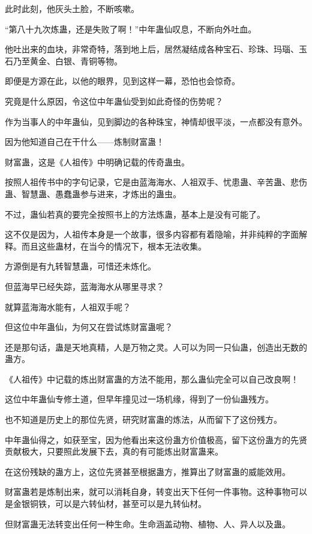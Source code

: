 \begin{this_body}
此时此刻，他灰头土脸，不断咳嗽。

“第八十九次炼蛊，还是失败了啊！”中年蛊仙叹息，不断向外吐血。

他吐出来的血块，非常奇特，落到地上后，居然凝结成各种宝石、珍珠、玛瑙、玉石乃至黄金、白银、青铜等物。

即便是方源在此，以他的眼界，见到这样一幕，恐怕也会惊奇。

究竟是什么原因，令这位中年蛊仙受到如此奇怪的伤势呢？

作为当事人的中年蛊仙，见到脚边的各种珠宝，神情却很平淡，一点都没有意外。

因为他知道自己在干什么——炼制财富蛊！

财富蛊，这是《人祖传》中明确记载的传奇蛊虫。

按照人祖传书中的字句记录，它是由蓝海海水、人祖双手、忧患蛊、辛苦蛊、悲伤蛊、智慧蛊、愚蠢蛊参与进来，才炼出的蛊虫。

不过，蛊仙若真的要完全按照书上的方法炼蛊，基本上是没有可能了。

这不仅是因为，人祖传本身是一个故事，很多内容都有着隐喻，并非纯粹的字面解释。而且这些蛊材，在当今的情况下，根本无法收集。

方源倒是有九转智慧蛊，可惜还未炼化。

但蓝海早已经失踪，蓝海海水从哪里寻求？

就算蓝海海水能有，人祖双手呢？

但这位中年蛊仙，为何又在尝试炼财富蛊呢？

还是那句话，蛊是天地真精，人是万物之灵。人可以为同一只仙蛊，创造出无数的蛊方。

《人祖传》中记载的炼出财富蛊的方法不能用，那么蛊仙完全可以自己改良啊！

这位中年蛊仙专修土道，但早年撞见过一场机缘，得到了一份仙蛊残方。

也不知道是历史上的那位先贤，研究财富蛊的炼法，从而留下了这份残方。

中年蛊仙得之，如获至宝，因为他看出来这份蛊方价值极高，留下这份蛊方的先贤贡献极大，只要照此发展下去，真的有可能炼出财富蛊来。

在这份残缺的蛊方上，这位先贤甚至根据蛊方，推算出了财富蛊的威能效用。

财富蛊若是炼制出来，就可以消耗自身，转变出天下任何一件事物。这种事物可以是金银铜铁，可以是六转仙材，甚至可以是九转仙材。

但财富蛊无法转变出任何一种生命。生命涵盖动物、植物、人、异人以及蛊。


\end{this_body}

